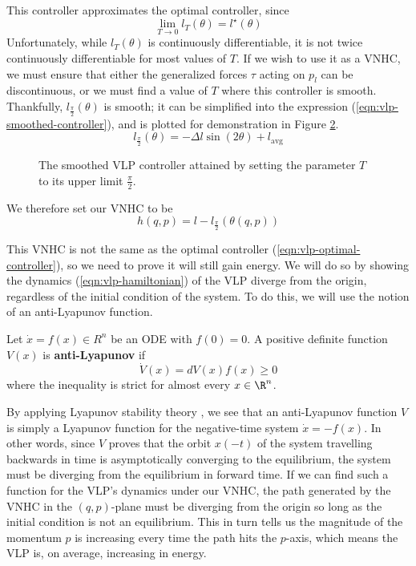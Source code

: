 \begin{figure}
   \centering
   \caption{}\label{fig:vlp-T-controller}
\end{figure}

This controller approximates the optimal controller, since 
\[
   \lim\limits_{T \rightarrow 0} l_T(\theta) = l^\star(\theta)
\]
Unfortunately, while \(l_T(\theta)\) is continuously differentiable, it is not
twice continuously differentiable for most values of \(T\).
If we wish to use it as a VNHC, we must ensure that either the generalized
forces \(\tau\) acting on \(p_l\) can be discontinuous, or we must find a value
of \(T\) where this controller is smooth.
Thankfully, \(l_{\frac{\pi}{2}}(\theta)\) is smooth; it can be simplified into
the expression (\ref{eqn:vlp-smoothed-controller}), and is plotted for
demonstration in Figure \ref{fig:vlp-smoothed-controller}.
\begin{equation}\label{eqn:vlp-smoothed-controller}
   l_\frac{\pi}{2}(\theta) = -\Delta l \sin(2\theta) + l_{\text{avg}}
\end{equation}

\begin{figure}
   \centering
   \caption{The smoothed VLP controller attained by setting the parameter 
      \(T\) to its upper limit
   \(\frac{\pi}{2}\).}\label{fig:vlp-smoothed-controller}
\end{figure}

We therefore set our VNHC to be
\[
   h(q,p) = l - l_\frac{\pi}{2}\left(\theta(q,p)\right)
\]

This VNHC is not the same as the optimal controller
(\ref{eqn:vlp-optimal-controller}), so we need to prove it will still gain
energy. We will do so by showing the dynamics (\ref{eqn:vlp-hamiltonian}) of the
VLP diverge from the origin, regardless of the initial condition of the system. 
To do this, we will use the notion of an anti-Lyapunov function.

\begin{defn}\label{defn:anti-lyapunov}
   Let \(\dot{x} = f(x) \in R^n\) be an ODE with \(f(0) = 0\). 
   A positive definite function \(V(x)\) is \textbf{anti-Lyapunov} if 
   \[
      \dot{V}(x) = dV(x) f(x) \geq 0
   \]
   where the inequality is strict for almost every \(x \in \R^n\).
\end{defn}

By applying Lyapunov stability theory \cite{lyapunov},
we see that an anti-Lyapunov function
\(V\) is simply a Lyapunov function for the negative-time system 
\(\dot{x} = -f(x)\). In other words, since \(V\) proves that the orbit \(x(-t)\) 
of the system travelling backwards in time is asymptotically converging to the
equilibrium, the system must be diverging from the equilibrium in forward time.
If we can find such a function for the VLP's dynamics under our VNHC, the path
generated by the VNHC in the \((q,p)\)-plane must be diverging from the origin
so long as the initial condition is not an equilibrium.
This in turn tells us the magnitude of the momentum \(p\) is increasing every
time the path hits the \(p\)-axis, which means the VLP is, on average,
increasing in energy.

